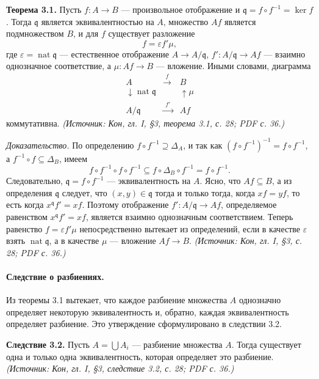 \documentclass[a4paper,12pt]{article}
\begin{document}
\textbf{Теорема 3.1.} Пусть \(f\colon A\to B\) — произвольное отображение и \(\mathfrak{q}=f\circ f^{-1}=\ker f\). Тогда \(\mathfrak{q}\) является эквивалентностью на \(A\), множество \(Af\) является подмножеством \(B\), и для \(f\) существует разложение
\[
f=\varepsilon f'\mu,
\]
где \(\varepsilon=\operatorname{nat}\mathfrak{q}\) — естественное отображение \(A\to A/\mathfrak{q}\), \(f'\colon A/\mathfrak{q}\to Af\) — взаимно однозначное соответствие, а \(\mu\colon Af\to B\) — вложение. Иными словами, диаграмма
\[
\begin{array}{ccc}
A & \xrightarrow{\ \ f\ \ } & B\\
\downarrow{\scriptstyle \operatorname{nat}\mathfrak{q}} & & \uparrow{\scriptstyle \mu}\\
A/\mathfrak{q} & \xrightarrow{\ \ f'\ \ } & Af
\end{array}
\]
коммутативна.
\textit{(Источник: Кон, гл. I, §3, теорема 3.1, с. 28; PDF с. 36.)}

\emph{Доказательство.} По определению \(f\circ f^{-1}\supseteq\Delta_A\), и так как \((f\circ f^{-1})^{-1}=f\circ f^{-1}\), а \(f^{-1}\circ f\subseteq\Delta_B\), имеем
\[
f\circ f^{-1}\circ f\circ f^{-1}\subseteq f\circ\Delta_B\circ f^{-1}=f\circ f^{-1}.
\]
Следовательно, \(\mathfrak{q}=f\circ f^{-1}\) — эквивалентность на \(A\). Ясно, что \(Af\subseteq B\), а из определения \(\mathfrak{q}\) следует, что \((x,y)\in\mathfrak{q}\) тогда и только тогда, когда \(xf=yf\), то есть когда \(x^{\mathfrak{q}}f'=xf\). Поэтому отображение \(f'\colon A/\mathfrak{q}\to Af\), определяемое равенством \(x^{\mathfrak{q}}f'=xf\), является взаимно однозначным соответствием. Теперь равенство \(f=\varepsilon f'\mu\) непосредственно вытекает из определений, если в качестве \(\varepsilon\) взять \(\operatorname{nat}\mathfrak{q}\), а в качестве \(\mu\) — вложение \(Af\to B\).
\textit{(Источник: Кон, гл. I, §3, с. 28; PDF с. 36.)}

\paragraph{Следствие о разбиениях.}
Из теоремы 3.1 вытекает, что каждое разбиение множества \(A\) однозначно определяет некоторую эквивалентность и, обратно, каждая эквивалентность определяет разбиение. Это утверждение сформулировано в следствии 3.2.

\textbf{Следствие 3.2.} Пусть \(A=\bigcup A_i\) — разбиение множества \(A\). Тогда существует одна и только одна эквивалентность, которая определяет это разбиение.
\textit{(Источник: Кон, гл. I, §3, следствие 3.2, с. 28; PDF с. 36.)}
\end{document}

